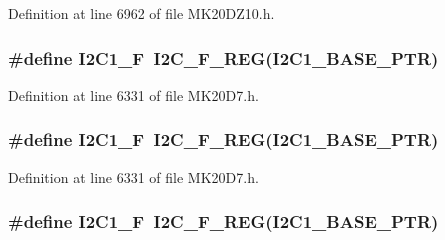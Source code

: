 Definition at line 6962 of file M\+K20\+D\+Z10.\+h.

\subsubsection[{\texorpdfstring{I2\+C1\+\_\+F}{I2C1_F}}]{\setlength{\rightskip}{0pt plus 5cm}\#define I2\+C1\+\_\+F~{\bf I2\+C\+\_\+\+F\+\_\+\+R\+EG}({\bf I2\+C1\+\_\+\+B\+A\+S\+E\+\_\+\+P\+TR})}\hypertarget{group___i2_c___register___accessor___macros_gaeb01706a855e5dbc5e864a0e18eeab36}{}\label{group___i2_c___register___accessor___macros_gaeb01706a855e5dbc5e864a0e18eeab36}


Definition at line 6331 of file M\+K20\+D7.\+h.

\subsubsection[{\texorpdfstring{I2\+C1\+\_\+F}{I2C1_F}}]{\setlength{\rightskip}{0pt plus 5cm}\#define I2\+C1\+\_\+F~{\bf I2\+C\+\_\+\+F\+\_\+\+R\+EG}({\bf I2\+C1\+\_\+\+B\+A\+S\+E\+\_\+\+P\+TR})}\hypertarget{group___i2_c___register___accessor___macros_gaeb01706a855e5dbc5e864a0e18eeab36}{}\label{group___i2_c___register___accessor___macros_gaeb01706a855e5dbc5e864a0e18eeab36}


Definition at line 6331 of file M\+K20\+D7.\+h.

\subsubsection[{\texorpdfstring{I2\+C1\+\_\+F}{I2C1_F}}]{\setlength{\rightskip}{0pt plus 5cm}\#define I2\+C1\+\_\+F~{\bf I2\+C\+\_\+\+F\+\_\+\+R\+EG}({\bf I2\+C1\+\_\+\+B\+A\+S\+E\+\_\+\+P\+TR})}\hypertarget{group___i2_c___register___accessor___macros_gaeb01706a855e5dbc5e864a0e18eeab36}{}\label{group___i2_c___register___accessor___macros_gaeb01706a855e5dbc5e864a0e18eeab36}


